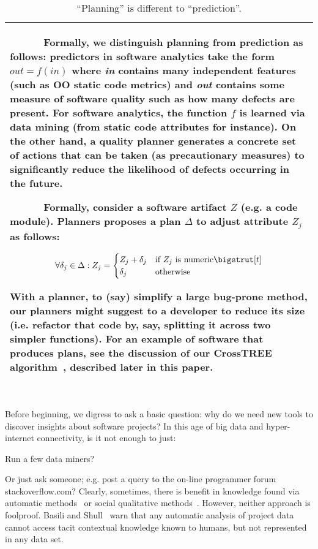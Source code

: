 

\begin{wraptable}{r}{3in}
\small
\caption{ ``Planning'' is different to ``prediction''.}\label{tab:planprd}

\begin{tabular}{|p{.95\linewidth}|}\hline



~~~~~~Formally, we distinguish planning from prediction as follows: predictors in software analytics take the form \mbox{$out = f(in)$}
where {\em in} contains many independent features (such as OO static code metrics) and {\em out} contains some measure of
software quality such as how many defects are present. For software analytics, the function $f$ is learned via data mining (from static code attributes for instance).
On the other hand, a quality planner generates a concrete set of actions that can be taken (as precautionary measures) to significantly reduce the likelihood of defects occurring in the future.

~~~~~~Formally,   consider a software artifact $Z$ (e.g. a code module). Planners
proposes a plan $\Delta$ to adjust attribute $Z_j$ as follows:

{\scriptsize \begin{equation*}
\forall \delta_j \in \Delta :  Z_j =  
\begin{cases}
     Z_j + \delta_j& \text{if $Z_j$ is numeric}\bigstrut[t]\\
    \delta_j              & \text{otherwise}
\end{cases}
\end{equation*}}

With a planner, to (say) simplify a large bug-prone method, our planners
might suggest to a developer to reduce its size (i.e. refactor that
code by, say, splitting it across two simpler functions).
For an example of software that produces plans, see the discussion of
our CrossTREE algorithm~\cite{krishna2017learning,Kr16}, described later in this paper.\\\hline
\end{tabular}
\end{wraptable}



~\\
 
Before beginning, we digress to ask a basic question:
why do we need new tools to discover insights about software projects? In this age of big data and  hyper-internet connectivity, is it not enough to just:
\bi
\item
Run a few data miners?
\item
Or just ask someone; e.g. post a query to the on-line programmer forum  stackoverflow.com? 
\ei
Clearly, sometimes, there is  benefit in  knowledge found
via automatic methods~\cite{Zimmermann2004}  or social qualitative methods~\cite{seaman1999qualitative}.
However, neither approach is    foolproof. 
Basili and Shull~\cite{shull02} warn that any automatic analysis of project data cannot access  tacit contextual
knowledge known to humans, but not represented in any data set.
 
